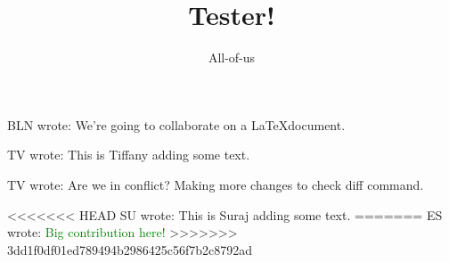 \documentclass[12pt]{article}
\title{Tester!}
\author{All-of-us}
\newcommand{\bln}[1]{BLN wrote: \textcolor{red!70!blue!70}{#1}}
\newcommand{\tv}[1]{TV wrote: \textcolor{blue!70}{#1}}
\newcommand{\su}[1]{SU wrote: \textcolor{green!70}{#1}}
\newcommand{\es}[1]{ES wrote: \textcolor{green}{#1}}
\begin{document}
\maketitle

\bln{We're going to collaborate on a \LaTeX document.}

\tv{This is Tiffany adding some text.}

\tv{Are we in conflict? Making more changes to check diff command.}

<<<<<<< HEAD
\su{This is Suraj adding some text.}
=======
\es{Big contribution here!}
>>>>>>> 3dd1f0df01ed789494b2986425c56f7b2c8792ad
\end{document}
